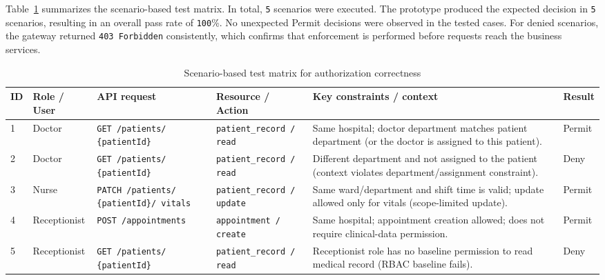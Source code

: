 Table~\ref{tab:scenario_test_matrix} summarizes the scenario-based test matrix. In total, \texttt{5} scenarios were
executed. The prototype produced the expected decision in \texttt{5} scenarios, resulting in an overall pass rate of
\texttt{100}\%. No unexpected Permit decisions were observed in the tested cases. For denied scenarios, the gateway returned
\texttt{403 Forbidden} consistently, which confirms that enforcement is performed before requests reach the business services.


\begin{table}[H]
\centering
\small
\begin{tabular}{|p{0.9cm}|p{2.4cm}|p{3.2cm}|p{2.8cm}|p{4.7cm}|p{1.2cm}|}
\hline
\textbf{ID} & \textbf{Role / User} & \textbf{API request } & \textbf{Resource / Action} & \textbf{Key constraints / context} & \textbf{Result} \\
\hline

1 & Doctor &
\texttt{GET /patients/ \{patientId\}} &
\texttt{patient\_record / read} &
Same hospital; doctor department matches patient department (or the doctor is assigned to this patient). &
Permit \\
\hline

2 & Doctor &
\texttt{GET /patients/ \{patientId\}} &
\texttt{patient\_record / read} &
Different department and not assigned to the patient (context violates department/assignment constraint). &
Deny \\
\hline

3 & Nurse &
\texttt{PATCH /patients/ \{patientId\}/ vitals} &
\texttt{patient\_record / update} &
Same ward/department and shift time is valid; update allowed only for vitals (scope-limited update). &
Permit \\
\hline

4 & Receptionist &
\texttt{POST /appointments} &
\texttt{appointment / create} &
Same hospital; appointment creation allowed; does not require clinical-data permission. &
Permit \\
\hline

5 & Receptionist &
\texttt{GET /patients/ \{patientId\}} &
\texttt{patient\_record / read} &
Receptionist role has no baseline permission to read medical record (RBAC baseline fails). &
Deny \\
\hline

\end{tabular}
\caption{Scenario-based test matrix for authorization correctness}
\label{tab:scenario_test_matrix}
\end{table}

